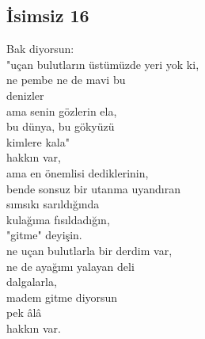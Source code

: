 \subsection{İsimsiz 16}

Bak diyorsun: \\
"uçan bulutların üstümüzde yeri yok ki, \\
	ne pembe ne de mavi bu \\
	denizler \\
		ama senin gözlerin ela, \\
		bu dünya, bu gökyüzü \\
			kimlere kala" \\

\noindent\newline
hakkın var, \\
ama en önemlisi dediklerinin, \\
	bende sonsuz bir utanma uyandıran \\
		sımsıkı sarıldığında \\
			kulağıma fısıldadığın, \\
				"gitme" deyişin. \\

\noindent\newline
ne uçan bulutlarla bir derdim var, \\
ne de ayağımı yalayan deli \\
dalgalarla, \\
madem gitme diyorsun \\
	pek âlâ \\
		hakkın var. \\